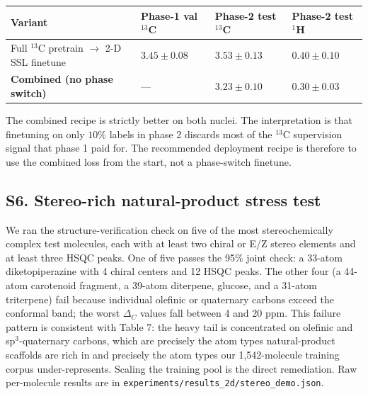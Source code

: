 \documentclass[
  11pt,
  a4paper,
]{article}
\newcounter{none} %
\begin{document}
{\def\LTcaptype{none} %
\begin{longtable}[]{@{}
  >{\raggedright\arraybackslash}p{}
  >{\raggedright\arraybackslash}p{}
  >{\raggedright\arraybackslash}p{}
  >{\raggedright\arraybackslash}p{}@{}}
\toprule\noalign{}
\begin{minipage}[b]{\linewidth}\raggedright
Variant
\end{minipage} & \begin{minipage}[b]{\linewidth}\raggedright
Phase-1 val \(^{13}\)C
\end{minipage} & \begin{minipage}[b]{\linewidth}\raggedright
Phase-2 test \(^{13}\)C
\end{minipage} & \begin{minipage}[b]{\linewidth}\raggedright
Phase-2 test \(^{1}\)H
\end{minipage} \\
\midrule\noalign{}
\endhead
\bottomrule\noalign{}
\endlastfoot
Full \(^{13}\)C pretrain \(\to\) 2-D SSL finetune & \(3.45 \pm 0.08\) & \(3.53 \pm 0.13\) & \(0.40 \pm 0.10\) \\
\textbf{Combined (no phase switch)} & --- & \textbf{\(3.23 \pm 0.10\)} & \textbf{\(0.30 \pm 0.03\)} \\
\end{longtable}
}

The combined recipe is strictly better on both nuclei. The
interpretation is that finetuning on only \(10\%\) labels in phase 2
discards most of the \(^{13}\)C supervision signal that phase 1 paid for.
The recommended deployment recipe is therefore to use the combined loss
from the start, not a phase-switch finetune.

\subsection*{S6. Stereo-rich natural-product stress test}

We ran the structure-verification check on five of the most
stereochemically complex test molecules, each with at least two
chiral or E/Z stereo elements and at least three HSQC peaks. One of
five passes the 95\(\%\) joint check: a 33-atom diketopiperazine with
4 chiral centers and 12 HSQC peaks. The other four (a 44-atom
carotenoid fragment, a 39-atom diterpene, glucose, and a 31-atom
triterpene) fail because individual olefinic or quaternary carbons
exceed the conformal band; the worst \(\Delta_{C}\) values fall
between 4 and 20 ppm. This failure pattern is consistent with Table
7: the heavy tail is concentrated on olefinic and sp\(^{3}\)-quaternary
carbons, which are precisely the atom types natural-product
scaffolds are rich in and precisely the atom types our
1,542-molecule training corpus under-represents. Scaling the training
pool is the direct remediation. Raw per-molecule results are in
\texttt{experiments/results\_2d/stereo\_demo.json}.
\end{document}
